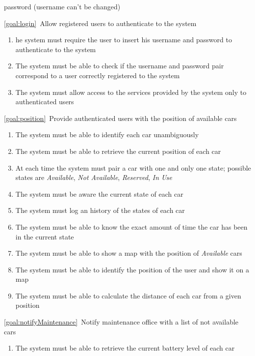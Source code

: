 \begin{description}
\begin{enumerate}[label=\textbf{R\arabic*}]
   				password (username can't be changed)
  			\end{enumerate}
		\item \ref{goal:login}\ Allow registered users to authenticate to the system
			\begin{enumerate}[resume*]
  				\item he system must require the user to insert his username and password to
  				authenticate to the system
   				\item The system must be able to check if the username and password pair
   				correspond to a user correctly registered to the system
   				\item The system must allow access to the services provided by the system only to
   				authenticated users 
			\end{enumerate}
		\item \ref{goal:position}\ Provide authenticated users with the position of available cars
			\begin{enumerate}[resume*]
				\item The system must be able to identify each car unambiguously
  				\item The system must be able to retrieve the current position of each car
  				\item At each time the system must pair a car with one and only one state; possible
  				states are \emph{Available}, \emph{Not Available}, \emph{Reserved}, \emph{In Use}
   				\item The system must be aware the current state of each car
   				\item The system must log an history of the states of each car 
   				\item The system must be able to know the exact amount of time the car has been in
   				the current state
   				\item The system must be able to show a map with the position of \emph{Available}
   				cars
  				\item The system must be able to identify the position of the user and show it on a
  				map
   				\item The system must be able to calculate the distance of each car from a given
   				position
  			\end{enumerate}
		\item \ref{goal:notifyMaintenance}\ Notify maintenance office with a list of not available
		cars
			\begin{enumerate}[resume*]
   				\item The system must be able to retrieve the current battery level of each car

\end{enumerate}
\end{description}
